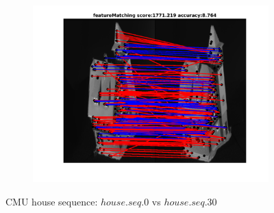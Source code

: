 \documentclass[
	fontsize=12pt,
	paper=a4,
	twoside=false,
	numbers=noenddot,
	plainheadsepline,
	toc=listof,
	toc=bibliography
]{scrartcl}
\begin{document}
\begin{figure}[h]
\begin{subfigure}[b]{0.3\textwidth}
		\includegraphics[scale=0.25]{"fig_ver2608/RealImages/House_seq/no_descr/using_cdf_afftrafo/solution/fi_4_featureMatching"}  
	\end{subfigure} 		
	\caption{CMU house sequence: $house.seq.0$ vs $house.seq.30$}
\end{figure}
\vspace{-20pt}
\end{document}
